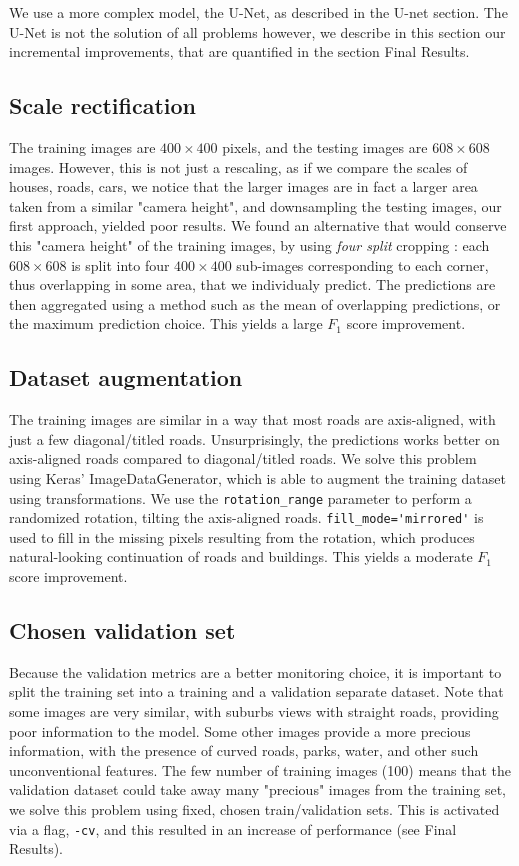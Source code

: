 \documentclass[10pt,conference,compsocconf]{IEEEtran}
\begin{document}
We use a more complex model, the U-Net, as described in the U-net section. The U-Net is not the solution of all problems however, we describe in this section our incremental improvements, that are quantified in the section Final Results.

\subsection{Scale rectification}

The training images are $400\times400$ pixels, and the testing images are $608\times608$ images. However, this is not just a rescaling, as if we compare the scales of houses, roads, cars, we notice that the larger images are in fact a larger area taken from a similar "camera height", and downsampling the testing images, our first approach, yielded poor results. We found an alternative that would conserve this "camera height" of the training images, by using \textit{four split} cropping : each $608\times608$ is split into four $400\times400$ sub-images corresponding to each corner, thus overlapping in some area, that we individualy predict. The predictions are then aggregated using a method such as the mean of overlapping predictions, or the maximum prediction choice. This yields a large $F_1$ score improvement.

\subsection{Dataset augmentation} \label{sub:aug}

The training images are similar in a way that most roads are axis-aligned, with just a few diagonal/titled roads. Unsurprisingly, the predictions works better on axis-aligned roads compared to diagonal/titled roads. We solve this problem using Keras' ImageDataGenerator, which is able to augment the training dataset using transformations. We use the \verb|rotation_range| parameter to perform a randomized rotation, tilting the axis-aligned roads. \verb|fill_mode='mirrored'| is used to fill in the missing pixels resulting from the rotation, which produces natural-looking continuation of roads and buildings. This yields a moderate $F_1$ score improvement.

\subsection{Chosen validation set}

Because the validation metrics are a better monitoring choice, it is important to split the training set into a training and a validation separate dataset. Note that some images are very similar, with suburbs views with straight roads, providing poor information to the model. Some other images provide a more precious information, with the presence of curved roads, parks, water, and other such unconventional features. The few number of training images (100) means that the validation dataset could take away many "precious" images from the training set, we solve this problem using fixed, chosen train/validation sets. This is activated via a flag, \verb|-cv|, and this resulted in an increase of performance (see Final Results).
\end{document}

